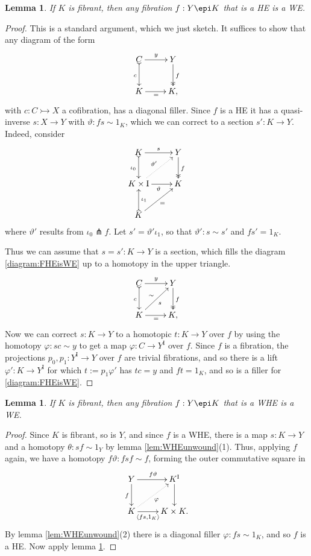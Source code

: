 \documentclass[12pt]{article}
\newcommand{\mono}{\ensuremath{\rightarrowtail}}
\newcommand{\ra}{\ensuremath{\rightarrow}}
\newcommand{\I}{\ensuremath{\mathrm{I}}}
\newtheorem{lemma}[theorem]{Lemma}
\theoremstyle{remark}
\theoremstyle{definition}
\begin{document}
\begin{lemma}\label{FibHETFib}
If $K$ is fibrant, then any fibration $f : Y \epi K$ that is a HE is a WE.
\end{lemma}
\begin{proof}
This is a standard argument, which we just sketch.  It suffices to show that any diagram of the form
\begin{equation}\label{diagram:FHEisWE}
\xymatrix{
C \ar@{>->}[d]_{c} \ar[r]^y & Y \ar@{>>}[d]^{f} \\
K\ar[r]_{=} & K,
}
\end{equation}
with  $c : C \mono X$  a cofibration, has a diagonal filler.  
Since $f$ is a HE it has a quasi-inverse $s:X\ra Y$ with $\vartheta : fs\sim 1_K$, which we can correct to a section $s' : K\ra Y$. 
Indeed, consider 
\begin{equation*}%
\xymatrix{
K \ar@{>->}[d]_{\iota_0} \ar[r]^{s}  & Y\ar@{>>}[d]^{f} \\
K\times \I \ar[r]_{\vartheta} \ar@{..>}[ru]^{\vartheta'}& K\\
K \ar@{>->}[u]_{\iota_1} \ar[ru]_=&
}
\end{equation*}
where $\vartheta' $ results from $\iota_0 \pitchfork f$. Let $s' = \vartheta' \iota_1$, so that $\vartheta' : s\sim s'$ and $fs' = 1_K$.

Thus we can assume that $s = s' : K\ra Y$ is a section, which fills the diagram \eqref{diagram:FHEisWE} up to a homotopy in the upper triangle.
\begin{equation*}%
\xymatrix{
C \ar@{>->}[d]_{c} \ar[r]^y & Y \ar@{>>}[d]^{f} \\
K\ar[r]_{=} \ar[ru]_{s}^{\sim} & K,
}
\end{equation*}
Now we can correct $s: K\ra Y$ to a homotopic $t : K\ra Y$ over $f$ by using the homotopy $\varphi : sc\sim y$  to get a map $\varphi : C\ra Y^\I$ over $f$.  Since $f$ is a fibration, the projections $p_0, p_1:Y^\I \ra Y$ over $f$ are trivial fibrations, and so there is a lift $\varphi': K\ra Y^\I$ for which $t:= p_1\varphi'$ has $tc= y$ and $ft=1_K$, and so is a filler for \eqref{diagram:FHEisWE}.
\end{proof}

\begin{lemma}\label{FibWHEfibCodTFib}
If $K$ is fibrant, then any fibration $f : Y \epi K$ that is a WHE is a WE.
\end{lemma}
\begin{proof}
Since $K$ is fibrant, so is $Y$, and since $f$ is a WHE, there is a map $s : K\ra Y$ and a homotopy $\theta: sf \sim 1_Y$ by lemma \ref{lem:WHEunwound}(1).  Thus, applying $f$ again, we have a homotopy $f\vartheta: fsf \sim f$, forming the outer commutative square in
\[
\xymatrix{
Y \ar[d]_{f} \ar[r]^{f\vartheta}  & K^\I \ar[d] \\
K \ar@{..>}[ru]_{\varphi} \ar[r]_-{\langle fs, 1_K\rangle} & K\times K.
}
\]
By lemma \ref{lem:WHEunwound}(2) there is a diagonal filler $\varphi : fs\sim 1_K$, and so $f$ is a HE. Now apply lemma \ref{FibHETFib}.
\end{proof}
\end{document}
